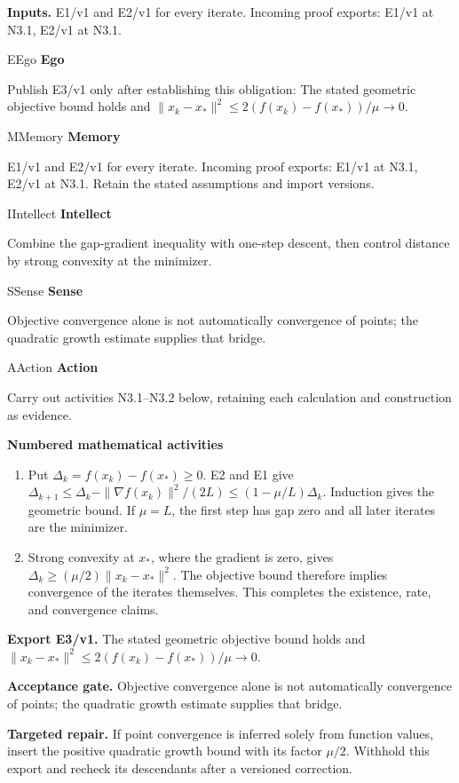 \documentclass[preprint,12pt,aps,pra,showkeys,amsmath,amssymb,superscriptaddress,floatfix]{revtex4-2}
\theoremstyle{definition}
\theoremstyle{remark}
\newcommand{\mmfaculty}[3]{%
 \begin{mmfacultybox}{#1}{#2}
 {\sffamily\bfseries\color{MMBlue}#2}\par\smallskip #3
 \end{mmfacultybox}}
\newcommand{\field}[2]{\par\smallskip\noindent\textbf{#1.} #2\par}
\begin{document}
\field{Inputs}{E1/v1 and E2/v1 for every iterate. Incoming proof exports: E1/v1 at
N3.1, E2/v1 at N3.1.}

\mmfaculty{E}{Ego}{Publish E3/v1 only after establishing this obligation: The stated
geometric objective bound holds and
\(\|x_k-x_*\|^2\le2(f(x_k)-f(x_*))/\mu\to0\).}

\mmfaculty{M}{Memory}{E1/v1 and E2/v1 for every iterate. Incoming proof exports: E1/v1 at
N3.1, E2/v1 at N3.1. Retain the stated assumptions and import versions.}

\mmfaculty{I}{Intellect}{Combine the gap-gradient inequality with one-step descent, then control
distance by strong convexity at the minimizer.}

\mmfaculty{S}{Sense}{Objective convergence alone is not automatically convergence of points;
the quadratic growth estimate supplies that bridge.}

\mmfaculty{A}{Action}{Carry out activities N3.1--N3.2 below, retaining each calculation and
construction as evidence.}

\smallskip\noindent\textbf{Numbered mathematical activities}

\begin{enumerate}[label=N3.\arabic*,leftmargin=3.4em]

\item Put \(\Delta_k=f(x_k)-f(x_*)\ge0\). E2 and E1 give
\(\Delta_{k+1}\le\Delta_k-\|\nabla f(x_k)\|^2/(2L)\le(1-\mu/L)\Delta_k\).
Induction gives the geometric bound. If \(\mu=L\), the first step has
gap zero and all later iterates are the minimizer.

\item Strong convexity at \(x_*\), where the gradient is zero, gives
\(\Delta_k\ge(\mu/2)\|x_k-x_*\|^2\). The objective bound therefore
implies convergence of the iterates themselves. This completes the
existence, rate, and convergence claims.

\end{enumerate}

\field{Export E3/v1}{The stated geometric objective bound holds and
\(\|x_k-x_*\|^2\le2(f(x_k)-f(x_*))/\mu\to0\).}

\field{Acceptance gate}{Objective convergence alone is not automatically convergence of points;
the quadratic growth estimate supplies that bridge.}

\field{Targeted repair}{If point convergence is inferred solely from function values, insert the
positive quadratic growth bound with its factor \(\mu/2\). Withhold this
export and recheck its descendants after a versioned correction.}
\end{document}
